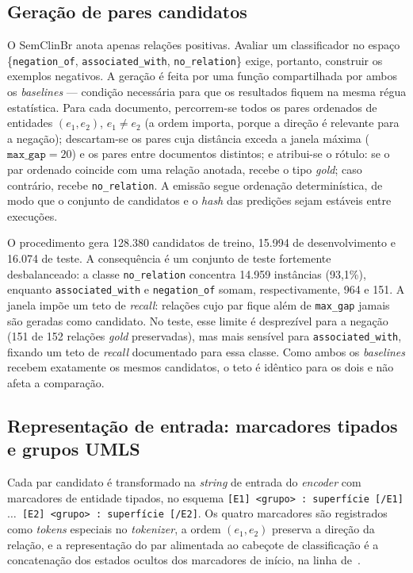 \documentclass[12pt]{article}
\begin{document}
\subsection{Geração de pares candidatos}
O SemClinBr anota apenas relações positivas. Avaliar um classificador no espaço
\{\texttt{negation\_of}, \texttt{associated\_with}, \texttt{no\_relation}\} exige,
portanto, construir os exemplos negativos. A geração é feita por uma função
compartilhada por ambos os \emph{baselines} --- condição necessária para que os
resultados fiquem na mesma régua estatística. Para cada documento, percorrem-se
todos os pares ordenados de entidades $(e_1, e_2)$, $e_1 \neq e_2$ (a ordem
importa, porque a direção é relevante para a negação); descartam-se os pares cuja
distância exceda a janela máxima ($\texttt{max\_gap}=20$) e os pares entre
documentos distintos; e atribui-se o rótulo: se o par ordenado coincide com uma
relação anotada, recebe o tipo \emph{gold}; caso contrário, recebe
\texttt{no\_relation}. A emissão segue ordenação determinística, de modo que o
conjunto de candidatos e o \emph{hash} das predições sejam estáveis entre
execuções.

O procedimento gera 128.380 candidatos de treino, 15.994 de desenvolvimento e
16.074 de teste. A consequência é um conjunto de teste fortemente desbalanceado:
a classe \texttt{no\_relation} concentra 14.959 instâncias (93,1\%), enquanto
\texttt{associated\_with} e \texttt{negation\_of} somam, respectivamente, 964 e
151. A janela impõe um teto de \emph{recall}: relações cujo par fique além de
\texttt{max\_gap} jamais são geradas como candidato. No teste, esse limite é
desprezível para a negação (151 de 152 relações \emph{gold} preservadas), mas
mais sensível para \texttt{associated\_with}, fixando um teto de \emph{recall}
documentado para essa classe. Como ambos os \emph{baselines} recebem exatamente
os mesmos candidatos, o teto é idêntico para os dois e não afeta a comparação.

\subsection{Representação de entrada: marcadores tipados e grupos UMLS}
Cada par candidato é transformado na \emph{string} de entrada do \emph{encoder}
com marcadores de entidade tipados, no esquema
\texttt{[E1] <grupo> : superfície [/E1] $\ldots$ [E2] <grupo> : superfície
[/E2]}. Os quatro marcadores são registrados como \emph{tokens} especiais no
\emph{tokenizer}, a ordem $(e_1, e_2)$ preserva a direção da relação, e a
representação do par alimentada ao cabeçote de classificação é a concatenação dos
estados ocultos dos marcadores de início, na linha de~\cite{soares:19}.
\end{document}
